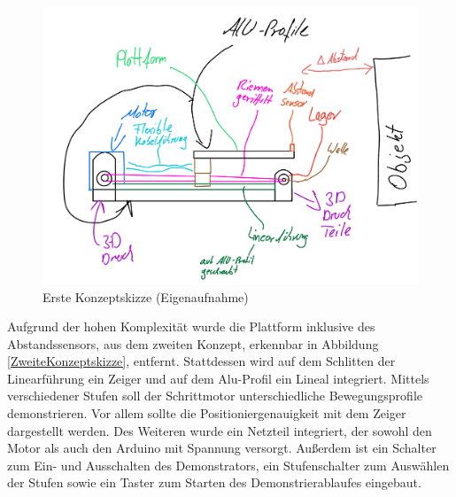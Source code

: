 \begin{figure}[htb]
	\begin{center}
		\includegraphics[width=\textwidth]{Images/Konzeptskizze1.png}
		\caption{Erste Konzeptskizze (Eigenaufnahme)} \label{ErsteKonzeptskizze}
\end{center}
\end{figure}

Aufgrund der hohen Komplexität wurde die Plattform inklusive des Abstandssensors, aus dem zweiten Konzept, erkennbar in Abbildung \ref{ZweiteKonzeptskizze}, entfernt. Stattdessen wird auf dem Schlitten der Linearführung ein Zeiger und auf dem Alu-Profil ein Lineal integriert. Mittels verschiedener Stufen soll der Schrittmotor unterschiedliche Bewegungsprofile demonstrieren. Vor allem sollte die Positioniergenauigkeit mit dem Zeiger dargestellt werden. Des Weiteren wurde ein Netzteil integriert, der sowohl den Motor als auch den Arduino mit Spannung versorgt. Außerdem ist ein Schalter zum Ein- und Ausschalten des Demonstrators, ein Stufenschalter zum Auswählen der Stufen sowie ein Taster zum Starten des Demonstrierablaufes eingebaut.  

